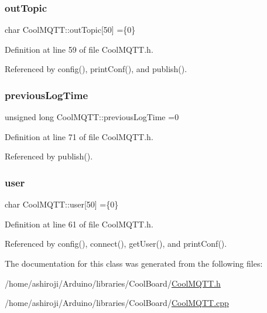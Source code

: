 \subsubsection{\texorpdfstring{out\+Topic}{outTopic}}
{\footnotesize\ttfamily char Cool\+M\+Q\+T\+T\+::out\+Topic\mbox{[}50\mbox{]} =\{\textquotesingle{}0\textquotesingle{}\}\hspace{0.3cm}{\ttfamily [private]}}



Definition at line 59 of file Cool\+M\+Q\+T\+T.\+h.



Referenced by config(), print\+Conf(), and publish().

\mbox{\label{classCoolMQTT_a3db37ef9ed3b05b2a8d44edba0e7d3cc}} 
\subsubsection{\texorpdfstring{previous\+Log\+Time}{previousLogTime}}
{\footnotesize\ttfamily unsigned long Cool\+M\+Q\+T\+T\+::previous\+Log\+Time =0\hspace{0.3cm}{\ttfamily [private]}}



Definition at line 71 of file Cool\+M\+Q\+T\+T.\+h.



Referenced by publish().

\mbox{\label{classCoolMQTT_a8cd47e45d457f908d4b4390b35aaee83}} 
\subsubsection{\texorpdfstring{user}{user}}
{\footnotesize\ttfamily char Cool\+M\+Q\+T\+T\+::user\mbox{[}50\mbox{]} =\{\textquotesingle{}0\textquotesingle{}\}\hspace{0.3cm}{\ttfamily [private]}}



Definition at line 61 of file Cool\+M\+Q\+T\+T.\+h.



Referenced by config(), connect(), get\+User(), and print\+Conf().



The documentation for this class was generated from the following files\+:\begin{DoxyCompactItemize}
\item 
/home/ashiroji/\+Arduino/libraries/\+Cool\+Board/\hyperlink{CoolMQTT_8h}{Cool\+M\+Q\+T\+T.\+h}\item 
/home/ashiroji/\+Arduino/libraries/\+Cool\+Board/\hyperlink{CoolMQTT_8cpp}{Cool\+M\+Q\+T\+T.\+cpp}\end{DoxyCompactItemize}
